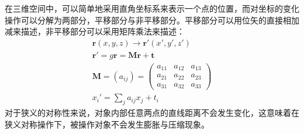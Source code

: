 在三维空间中，可以简单地采用直角坐标系来表示一个点的位置，而对坐标的变化操作可以分解为两部分，平移部分与非平移部分。平移部分可以用位矢的直接相加减来描述，非平移部分可以采用矩阵乘法来描述：
\begin{gather}
    \bm{r}(x,y,z) \rightarrow \bm{r}'(x',y',z') \\
    \bm{r}'=g\bm{r}=\bm{M}\bm{r}+\bm{t} \\
    \bm{M}=(a_{ij})= \begin{pmatrix}
        a_{11}&a_{12}&a_{13}\\
        a_{21}&a_{22}&a_{23}\\
        a_{31}&a_{32}&a_{33}
    \end{pmatrix}
    \\
    x_{i}' = \sum_{j} a_{ij} x_{j}+t_{i}
\end{gather}
对于狭义的对称性来说，对象内部任意两点的直线距离不会发生变化，这意味着在狭义对称操作下，被操作对象不会发生膨胀与压缩现象。

